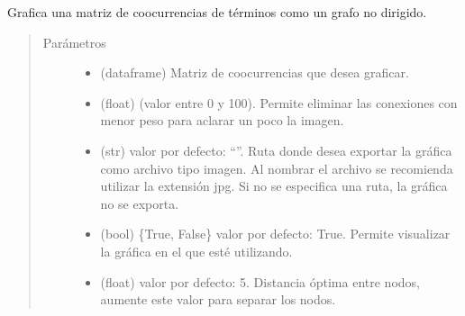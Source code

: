 \documentclass[letterpaper,10pt,openany,spanish]{sphinxmanual}
\begin{document}
\begin{fulllineitems}
\label{\detokenize{funciones/exploracion:exploracion.graficar_coocurrencias}}
Grafica una matriz de co\sphinxhyphen{}ocurrencias de términos como un grafo no dirigido.
\begin{quote}\begin{description}
\item[{Parámetros}] \leavevmode\begin{itemize}
\item {} 
 \textendash{} (dataframe) Matriz de co\sphinxhyphen{}ocurrencias que desea graficar.

\item {} 
 \textendash{} (float) (valor entre 0 y 100). Permite eliminar las conexiones con menor peso para aclarar un poco la imagen.

\item {} 
 \textendash{} (str) valor por defecto: “”. Ruta donde desea exportar la gráfica como archivo tipo imagen. Al nombrar el archivo se recomienda utilizar la extensión jpg. Si no se especifica una ruta, la gráfica no se exporta.

\item {} 
 \textendash{} (bool) \{True, False\} valor por defecto: True. Permite visualizar la gráfica en el  que esté utilizando.

\item {} 
 \textendash{} (float) valor por defecto: 5. Distancia óptima entre nodos, aumente este valor para separar los nodos.


\end{itemize}
\end{description}
\end{quote}
\end{fulllineitems}
\end{document}
